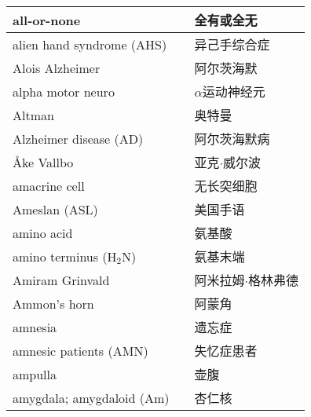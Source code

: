 \begin{longtable}{lll}
	\midrule
	all-or-none     &&  全有或全无  \\
	
	\midrule
	alien hand syndrome (AHS)     &&  异己手综合症  \\
	
	\midrule
	Alois Alzheimer     &&  阿尔茨海默  \\
	
	\midrule
	alpha motor neuro     &&  $\alpha$运动神经元  \\
	
	\midrule
	Altman     &&  奥特曼  \\
	
	\midrule
	Alzheimer disease (AD)     &&  阿尔茨海默病  \\
	
	\midrule
	Åke Vallbo     &&  亚克$\cdot$威尔波  \\
	
	\midrule
	amacrine cell     && 无长突细胞   \\
	
	\midrule
	Ameslan (ASL)    && 美国手语   \\
	
	\midrule
	amino acid   && 氨基酸   \\
	
	\midrule
	amino terminus (H$_2$N)   && 氨基末端   \\
	
	\midrule
	Amiram Grinvald    && 阿米拉姆$\cdot$格林弗德   \\
	
	\midrule
	Ammon's horn    && 阿蒙角   \\
	
	\midrule
	amnesia    && 遗忘症   \\
	
	\midrule
	amnesic patients (AMN)    && 失忆症患者   \\
	
	\midrule
	ampulla    && 壶腹   \\
	
	\midrule
	amygdala; amygdaloid (Am)    && 杏仁核   \\
	

\end{longtable}
